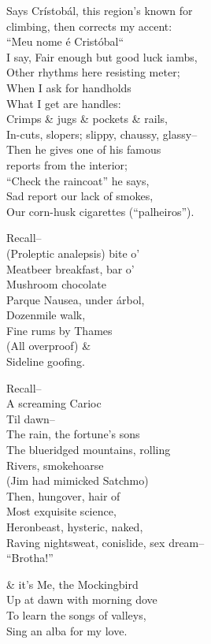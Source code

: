 Says Crístobál, this region's known for \\
climbing, then corrects my accent: \\
``Meu nome é Cristóbal`` \\
I say, Fair enough but good luck iambs, \\
Other rhythms here resisting meter; \\
When I ask for handholds \\
What I get are handles: \\
Crimps \& jugs \& pockets \& rails, \\
In-cuts, slopers; slippy, chaussy, glassy-- \\
Then he gives one of his famous \\
reports from the interior; \\
``Check the raincoat'' he says, \\
Sad report our lack of smokes, \\
Our corn-husk cigarettes (``palheiros'').

Recall-- \\
(Proleptic analepsis) bite o' \\
Meatbeer breakfast, bar o' \\
Mushroom chocolate \\
Parque Nausea, under árbol, \\
Dozenmile walk, \\
Fine rums by Thames \\
(All overproof) \& \\
Sideline goofing.

Recall-- \\
A screaming Carioc \\
Til dawn-- \\
The rain, the fortune's sons \\
The blueridged mountains, rolling \\
Rivers, smokehoarse \\
(Jim had mimicked Satchmo) \\
Then, hungover, hair of \\
Most exquisite science, \\
Heronbeast, hysteric, naked, \\
Raving nightsweat, conislide, sex dream-- \\
``Brotha!''

\& it's Me, the Mockingbird \\
Up at dawn with morning dove \\
To learn the songs of valleys, \\
Sing an alba for my love.
